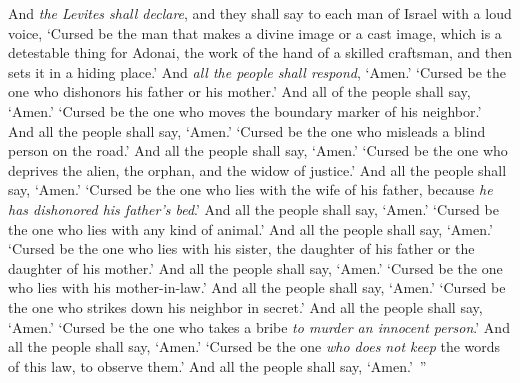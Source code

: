 \begin{biblechapter}
\verse And \textit{the Levites shall declare}, and they shall say to each man of Israel with a loud voice,
\verse ‘Cursed be the man that makes a divine image or a cast image, which is a detestable thing for Adonai, the work of the hand of a skilled craftsman, and then sets it in a hiding place.’ And \textit{all the people shall respond}, ‘Amen.’
\verse ‘Cursed be the one who dishonors his father or his mother.’ And all of the people shall say, ‘Amen.’
\verse ‘Cursed be the one who moves the boundary marker of his neighbor.’ And all the people shall say, ‘Amen.’
\verse ‘Cursed be the one who misleads a blind person on the road.’ And all the people shall say, ‘Amen.’
\verse ‘Cursed be the one who deprives the alien, the orphan, and the widow of justice.’ And all the people shall say, ‘Amen.’
\verse ‘Cursed be the one who lies with the wife of his father, because \textit{he has dishonored his father’s bed}.’ And all the people shall say, ‘Amen.’
\verse ‘Cursed be the one who lies with any kind of animal.’ And all the people shall say, ‘Amen.’
\verse ‘Cursed be the one who lies with his sister, the daughter of his father or the daughter of his mother.’ And all the people shall say, ‘Amen.’
\verse ‘Cursed be the one who lies with his mother-in-law.’ And all the people shall say, ‘Amen.’
\verse ‘Cursed be the one who strikes down his neighbor in secret.’ And all the people shall say, ‘Amen.’
\verse ‘Cursed be the one who takes a bribe \textit{to murder an innocent person}.’ And all the people shall say, ‘Amen.’
\verse ‘Cursed be the one \textit{who does not keep} the words of this law, to observe them.’ And all the people shall say, ‘Amen.’ ”
\end{biblechapter}

